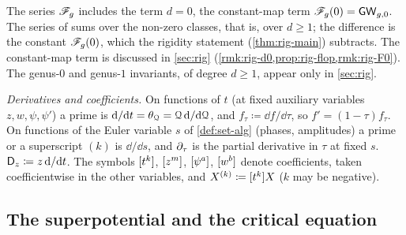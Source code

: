 \begin{rmk}
\label{rmk:set-d0}
The series $\mathscr{F}_g$ includes the term $d=0$, the constant-map term $\mathscr{F}_g(0)=\mathsf{GW}_{g,0}$. The series of \cite{BS} sums over the non-zero classes, that is, over $d\geq1$; the difference is the constant $\mathscr{F}_g(0)$, which the rigidity statement (\cref{thm:rig-main}) subtracts. The constant-map term is discussed in \cref{sec:rig} (\cref{rmk:rig-d0,prop:rig-flop,rmk:rig-F0}). The genus-$0$ and genus-$1$ invariants, of degree $d\geq1$, appear only in \cref{sec:rig}.
\end{rmk}

\emph{Derivatives and coefficients.} On functions of $t$ (at fixed auxiliary variables $z,w,\psi,\psi'$) a prime is $\mathrm{d}/\mathrm{d} t=\theta_{\mathcal{Q}}=\mathcal{Q}\,\mathrm{d}/\mathrm{d}\mathcal{Q}$, and $f_\tau\coloneqq\dd f/\dd\tau$, so $f'=(1-\tau)f_\tau$. On functions of the Euler variable $s$ of \cref{def:set-alg} (phases, amplitudes) a prime or a superscript $(k)$ is $\dd/\dd s$, and $\partial_\tau$ is the partial derivative in $\tau$ at fixed $s$. $\mathsf{D}_{z}\coloneqq z\,\mathrm{d}/\mathrm{d} t$. The symbols $[t^k]$, $[z^m]$, $[\psi^a]$, $[w^b]$ denote coefficients, taken coefficientwise in the other variables, and $X^{(k)}\coloneqq[t^k]X$ ($k$ may be negative).

\subsection{The superpotential and the critical equation}
\label{sec:set-crit}

